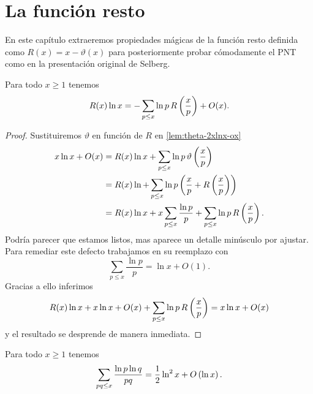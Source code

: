 \setlength{\headheight}{14.61858pt}
\pagestyle{fancy}

\chapter[La funci\'on resto]
{La funci\'on resto}
\label{ch:remainder}

En este cap\'itulo extraeremos propiedades m\'agicas
de la funci\'on resto definida como \(R(x) = x - \vartheta(x)\)
\cite[secci\'on 3]{Selberg1949}
para posteriormente probar c\'omodamente el PNT
como en la presentaci\'on original de Selberg.

\begin{lemma}
    \label{lem:rlnx1}
    Para todo \(x \geq 1\) tenemos
    \[
        R(x) \ln x = -\sum_{p \leq x} \ln p \, R \left( \frac{x}{p} \right) + O(x).
    \]
\end{lemma}

\begin{proof}
    Sustituiremos \(\vartheta\) en funci\'on de \(R\) en \cref{lem:theta-2xlnx-ox}
    \begin{align*}
        x\ln x + O(x)
        &= R(x) \ln x
        + \sum_{p \leq x} \ln p \, \vartheta \left( \frac{x}{p} \right) \\
        &= R(x) \ln
        + \sum_{p \leq x} \ln p \left( \frac{x}{p}
        + R\left( \frac{x}{p} \right) \right) \\
        &= R(x) \ln x
        + x \sum_{p \leq x} \frac{\ln p}{p}
        + \sum_{p \leq x} \ln p \, R \left( \frac{x}{p} \right).
    \end{align*}
    Podr\'ia parecer que estamos listos, mas aparece un detalle min\'usculo por ajustar.
    Para remediar este defecto trabajamos en su reemplazo con \cite[teorema 2]{Mertens1874}
    \[
        \sum_{p \leq x} \frac{\ln p}{p} = \ln x + O(1).
    \]
    Gracias a ello inferimos
    \[
        R(x) \ln x + x \ln x + O(x)
        + \sum_{p \leq x} \ln p \, R \left( \frac{x}{p} \right)
        = x \ln x + O(x)
    \]
    y el resultado se desprende de manera inmediata.
\end{proof}

\begin{lemma}
    \label{lem:1-2ln2x-o-lnx}
    Para todo \(x \geq 1\) tenemos
    \[
        \sum_{pq \leq x} \frac{\ln p \ln q}{pq}
        = \frac{1}{2} \ln^2 x + O\left( \ln x \right).    
    \]
\end{lemma}

